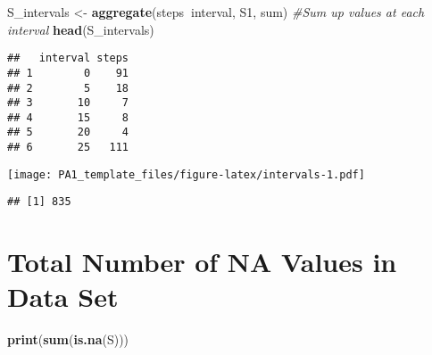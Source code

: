 \documentclass[]{article}
\newenvironment{Shaded}{\begin{snugshade}}{\end{snugshade}}
\newcommand{\KeywordTok}[1]{\textcolor[rgb]{0.13,0.29,0.53}{\textbf{#1}}}
\newcommand{\DataTypeTok}[1]{\textcolor[rgb]{0.13,0.29,0.53}{#1}}
\newcommand{\StringTok}[1]{\textcolor[rgb]{0.31,0.60,0.02}{#1}}
\newcommand{\CommentTok}[1]{\textcolor[rgb]{0.56,0.35,0.01}{\textit{#1}}}
\newcommand{\OperatorTok}[1]{\textcolor[rgb]{0.81,0.36,0.00}{\textbf{#1}}}
\newcommand{\NormalTok}[1]{#1}
\begin{document}
\begin{Shaded}
\begin{Highlighting}[]
\NormalTok{S_intervals <-}\StringTok{ }\KeywordTok{aggregate}\NormalTok{(steps}\OperatorTok{~}\NormalTok{interval, S1, sum) }\CommentTok{#Sum up values at each interval}
\KeywordTok{head}\NormalTok{(S_intervals)}
\end{Highlighting}
\end{Shaded}

\begin{verbatim}
##   interval steps
## 1        0    91
## 2        5    18
## 3       10     7
## 4       15     8
## 5       20     4
## 6       25   111
\end{verbatim}

\begin{Shaded}
\end{Shaded}

\texttt{[image: PA1\_template\_files/figure-latex/intervals-1.pdf]}

\begin{Shaded}
\end{Shaded}

\begin{verbatim}
## [1] 835
\end{verbatim}

\section{Total Number of NA Values in Data
Set}\label{total-number-of-na-values-in-data-set}

\begin{Shaded}
\begin{Highlighting}[]
\KeywordTok{print}\NormalTok{(}\KeywordTok{sum}\NormalTok{(}\KeywordTok{is.na}\NormalTok{(S)))}
\end{Highlighting}
\end{Shaded}
\end{document}
